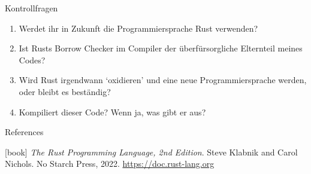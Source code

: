 \begin{frame}[t]{Kontrollfragen}
    \begin{tcolorbox}[purplebox]
        \begin{enumerate}
            \item Werdet ihr in Zukunft die Programmiersprache Rust verwenden?
            \item Ist Rusts Borrow Checker im Compiler der überfürsorgliche Elternteil meines Codes?
            \item Wird Rust irgendwann `oxidieren' und eine neue Programmiersprache werden, oder bleibt es beständig?
            \item Kompiliert dieser Code? Wenn ja, was gibt er aus?\\
            
        \end{enumerate}
    \end{tcolorbox}
\end{frame}

\begin{frame}[allowframebreaks]{References}
    \begin{thebibliography}{}
        [book]
        \emph{The Rust Programming Language, 2nd Edition}.
        \newblock Steve Klabnik and Carol Nichols.
        \newblock No Starch Press, 2022.
        \newblock \url{https://doc.rust-lang.org}


    \end{thebibliography}
\end{frame}
